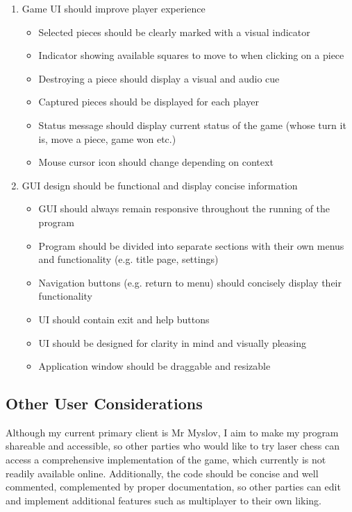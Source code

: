 \documentclass[../main/main.tex]{subfiles}
\begin{document}
\begin{enumerate}
\item Game UI should improve player experience
    \begin{itemize}
    \item Selected pieces should be clearly marked with a visual indicator
    \item Indicator showing available squares to move to when clicking on a piece
    \item Destroying a piece should display a visual and audio cue
    \item Captured pieces should be displayed for each player
    \item Status message should display current status of the game (whose turn it is, move a piece, game won etc.)
    \item Mouse cursor icon should change depending on context
    \end{itemize}
\item GUI design should be functional and display concise information
    \begin{itemize}
    \item \label{itm:responsive-objective} GUI should always remain responsive throughout the running of the program
    \item Program should be divided into separate sections with their own menus and functionality (e.g. title page, settings)
    \item Navigation buttons (e.g. return to menu) should concisely display their functionality
    \item UI should contain exit and help buttons
    \item UI should be designed for clarity in mind and visually pleasing
    \item Application window should be draggable and resizable
    \end{itemize}
\end{enumerate}

\subsection{Other User Considerations}
Although my current primary client is Mr Myslov, I aim to make my program shareable and accessible, so other parties who would like to try laser chess can access a comprehensive implementation of the game, which currently is not readily available online. Additionally, the code should be concise and well commented, complemented by proper documentation, so other parties can edit and implement additional features such as multiplayer to their own liking.
\end{document}
